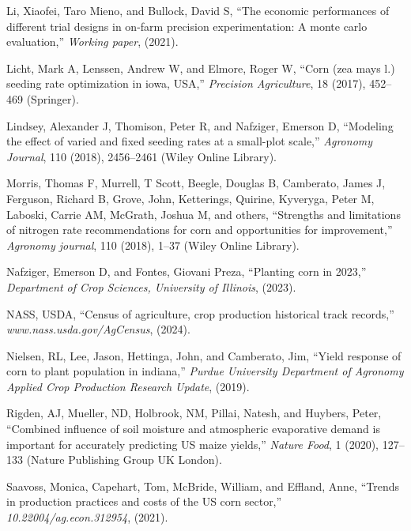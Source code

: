 \documentclass[
]{article}
\newlength{\cslhangindent}
\newenvironment{CSLReferences}[2] %
 {\begin{list}{}{%
  \setlength{\itemindent}{0pt}
  \setlength{\leftmargin}{0pt}
  \setlength{\parsep}{0pt}
  \ifodd #1
   \setlength{\leftmargin}{\cslhangindent}
   \setlength{\itemindent}{-1\cslhangindent}
  \fi
  \setlength{\itemsep}{#2\baselineskip}}}
 {\end{list}}
\begin{document}
\begin{CSLReferences}{1}{0}
Li, Xiaofei, Taro Mieno, and Bullock, David S, {``The economic
performances of different trial designs in on-farm precision
experimentation: A monte carlo evaluation,''} \emph{Working paper},
(2021).

Licht, Mark A, Lenssen, Andrew W, and Elmore, Roger W, {``Corn (zea mays
l.) seeding rate optimization in iowa, USA,''} \emph{Precision
Agriculture}, 18 (2017), 452--469 (Springer).

Lindsey, Alexander J, Thomison, Peter R, and Nafziger, Emerson D,
{``Modeling the effect of varied and fixed seeding rates at a small-plot
scale,''} \emph{Agronomy Journal}, 110 (2018), 2456--2461 (Wiley Online
Library).

Morris, Thomas F, Murrell, T Scott, Beegle, Douglas B, Camberato, James
J, Ferguson, Richard B, Grove, John, Ketterings, Quirine, Kyveryga,
Peter M, Laboski, Carrie AM, McGrath, Joshua M, and others, {``Strengths
and limitations of nitrogen rate recommendations for corn and
opportunities for improvement,''} \emph{Agronomy journal}, 110 (2018),
1--37 (Wiley Online Library).

Nafziger, Emerson D, and Fontes, Giovani Preza, {``Planting corn in
2023,''} \emph{Department of Crop Sciences, University of Illinois},
(2023).

NASS, USDA, {``Census of agriculture, crop production historical track
records,''} \emph{www.nass.usda.gov/AgCensus}, (2024).

Nielsen, RL, Lee, Jason, Hettinga, John, and Camberato, Jim, {``Yield
response of corn to plant population in indiana,''} \emph{Purdue
University Department of Agronomy Applied Crop Production Research
Update}, (2019).

Rigden, AJ, Mueller, ND, Holbrook, NM, Pillai, Natesh, and Huybers,
Peter, {``Combined influence of soil moisture and atmospheric
evaporative demand is important for accurately predicting US maize
yields,''} \emph{Nature Food}, 1 (2020), 127--133 (Nature Publishing
Group UK London).

Saavoss, Monica, Capehart, Tom, McBride, William, and Effland, Anne,
{``Trends in production practices and costs of the US corn sector,''}
\emph{10.22004/ag.econ.312954}, (2021).


\end{CSLReferences}
\end{document}
